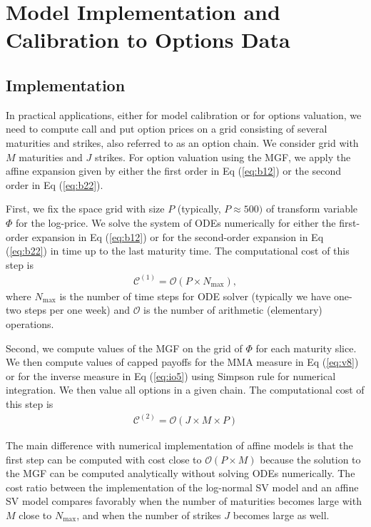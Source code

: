\documentclass[11pt,a4paper] {article}
\begin{document}
\section{Model Implementation and Calibration to Options Data}\label{sec:empirics}

\subsection{Implementation}

In practical applications, either for model calibration or for options valuation, we need to compute call and put option prices on a grid consisting of several maturities and strikes, also referred to as an option chain. We consider grid with $M$ maturities and $J$ strikes. For option valuation using the MGF, we apply the affine expansion given by either the first order in Eq (\ref{eq:b12}) or the second order in Eq (\ref{eq:b22}).

First, we fix the space grid with size $P$ (typically, $P\approx 500)$ of transform variable $\Phi$ for the log-price. We solve the system of ODEs numerically for either the first-order expansion in Eq (\ref{eq:b12}) or for the second-order expansion in Eq (\ref{eq:b22}) in time up to the last maturity time. The computational cost of this step is
\begin{equation}\label {eq:comp2}
\begin{split}
\mathcal{C}^{(1)} = \mathcal{O} \left( P \times N_{\max} \right),
\end{split}
\end{equation}
where $N_{\max}$ is the number of time steps for ODE solver (typically we have one-two steps per one week) and $\mathcal{O}$ is the number of arithmetic (elementary) operations.


Second, we compute values of the MGF on the grid of $\Phi$ for each maturity slice. We then compute values of capped payoffs for the MMA measure in Eq (\ref{eq:v8}) or for the inverse measure in Eq (\ref{eq:io5}) using Simpson rule for numerical integration. We then value all options in a given chain. The computational cost of this step is
\begin{equation}\label {eq:comp3}
\begin{split}
\mathcal{C}^{(2)} = \mathcal{O}  \left( J \times M \times P \right)
\end{split}
\end{equation}


The main difference with numerical implementation of affine models is that the first step can be computed with cost close to $\mathcal{O} \left( P \times M\right)$ because the solution to the MGF can be computed analytically without solving ODEs numerically. The cost ratio between the implementation of the log-normal SV model and an affine SV model compares favorably when the number of maturities becomes large with $M$ close to $N_{\max}$, and when the number of strikes $J$ becomes large as well.
\end{document}
